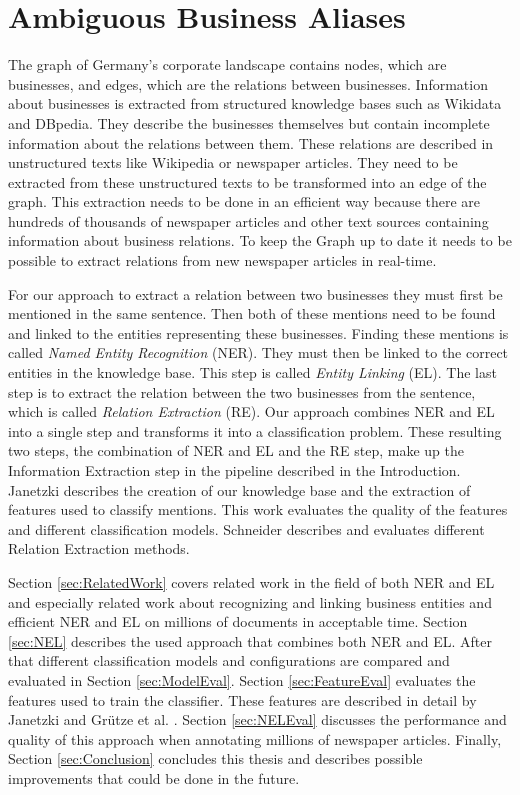 \section{Ambiguous Business Aliases}
\label{sec:IntroABA}
The graph of Germany's corporate landscape contains nodes, which are businesses, and edges, which are the relations between businesses. Information about businesses is extracted from structured knowledge bases such as Wikidata and DBpedia. They describe the businesses themselves but contain incomplete information about the relations between them. These relations are described in unstructured texts like Wikipedia or newspaper articles. They need to be extracted from these unstructured texts to be transformed into an edge of the graph. This extraction needs to be done in an efficient way because there are hundreds of thousands of newspaper articles and other text sources containing information about business relations. To keep the Graph up to date it needs to be possible to extract relations from new newspaper articles in real-time.\par
For our approach to extract a relation between two businesses they must first be mentioned in the same sentence. Then both of these mentions need to be found and linked to the entities representing these businesses. Finding these mentions is called \textit{Named Entity Recognition} (NER). They must then be linked to the correct entities in the knowledge base. This step is called \textit{Entity Linking} (EL). The last step is to extract the relation between the two businesses from the sentence, which is called \textit{Relation Extraction} (RE). Our approach combines NER and EL into a single step and transforms it into a classification problem. These resulting two steps, the combination of NER and EL and the RE step, make up the Information Extraction step in the pipeline described in the Introduction. Janetzki \cite{janetzki} describes the creation of our knowledge base and the extraction of features used to classify mentions. This work evaluates the quality of the features and different classification models. Schneider \cite{schneider} describes and evaluates different Relation Extraction methods.\par
Section \ref{sec:RelatedWork} covers related work in the field of both NER and EL and especially related work about recognizing and linking business entities and efficient NER and EL on millions of documents in acceptable time. Section \ref{sec:NEL} describes the used approach that combines both NER and EL. After that different classification models and configurations are compared and evaluated in Section \ref{sec:ModelEval}. Section \ref{sec:FeatureEval} evaluates the features used to train the classifier. These features are described in detail by Janetzki \cite{janetzki} and Grütze et al. \cite{coheel}. Section \ref{sec:NELEval} discusses the performance and quality of this approach when annotating millions of newspaper articles. Finally, Section \ref{sec:Conclusion} concludes this thesis and describes possible improvements that could be done in the future.

